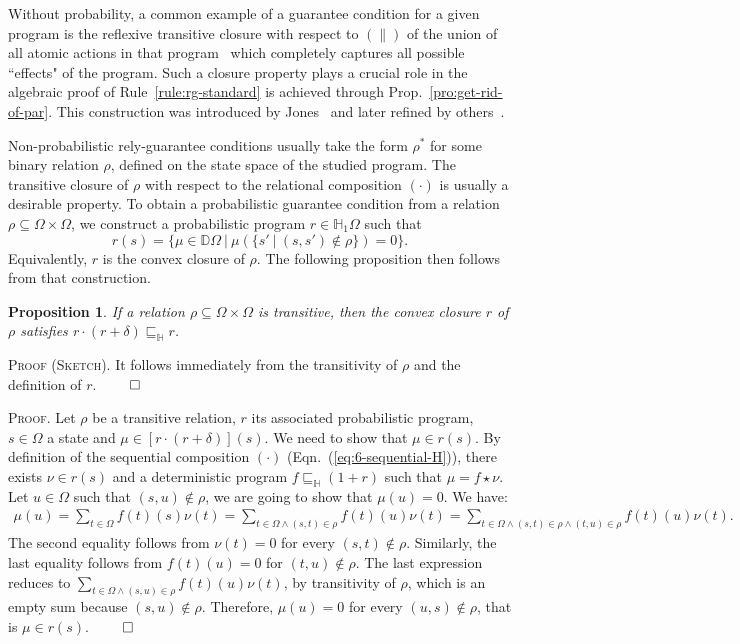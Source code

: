 \documentclass[review]{elsart}
\newtheorem{proposition}[definition]{Proposition}
\newenvironment{proof}{\par
\noindent
\textsc{Proof. }
\noindent}{\hfill\(\qed\)}
\newenvironment{proofsummary}{\par
\noindent
\textsc{Proof (Sketch). }
\noindent}{\hfill\(\qed\)}
\newcommand{\D}{\mathbb{D}}
\renewcommand{\H}{\mathbb{H}}
\newcommand{\unity}{\delta}
\newcommand{\convol}{\star}
\newcommand{\bks}{*}
\newcommand{\refbyh}{\sqsubseteq_{\mathbb{H}}}
\newcommand{\Eqn}[1]{Eqn.~(\ref{#1})}
\newcommand{\Prop}[1]{Prop.~\ref{#1}}
\begin{document}
Without probability, a common example of a guarantee condition for a given program is the reflexive transitive closure with respect to $(\|)$ of the union of all atomic actions in that program~\cite{Hoa09a} which completely captures all possible ``effects" of the program. Such a closure property plays a crucial role in the algebraic proof of Rule~\ref{rule:rg-standard} is achieved through \Prop{pro:get-rid-of-par}. This construction was introduced by Jones~\cite{Jon81} and later refined by others~\cite{Din02,Jon12,Hoa09a}.

Non-probabilistic rely-guarantee conditions usually take the form $\rho^{\bks}$ for some binary relation $\rho$, defined on the state space of the studied program. The transitive closure of $\rho$ with respect to the relational composition $(\cdot)$ is usually a desirable property. To obtain a probabilistic guarantee condition from a relation $\rho{\subseteq}\Omega{\times}\Omega$, we construct a probabilistic program $r{\in} \H_1\Omega$  such that 
\[
	r(s) = \{\mu{\in}\D \Omega\ |\ \mu(\{s'\ |\ (s,s'){\notin} \rho\}) = 0\}.
\]
Equivalently, $r$ is the convex closure of $\rho$. The following proposition then follows from that construction.
\begin{proposition}\label{pro:transitive-convex-closure}
If a relation $\rho{\subseteq}\Omega{\times}\Omega$ is transitive, then the convex closure $r$ of $\rho$ satisfies $r{\cdot}(r{+}\unity)\refbyh r$.
\end{proposition}

\begin{proofsummary}
It follows immediately from the transitivity of $\rho$ and the definition of $r$.
\end{proofsummary}

\begin{proof}
Let $\rho$ be a transitive relation, $r$ its associated probabilistic program, $s{\in}\Omega$ a state and  $\mu{\in} [r{\cdot}(r{+}\unity)](s)$. We need to show that $\mu{\in} r(s)$. By definition of the sequential composition $(\cdot)$ (\Eqn{eq:6-sequential-H}), there exists $\nu{\in} r(s)$ and a deterministic program $f\refbyh (1{+}r)$ such that $\mu = f{\convol}\nu$. Let $u{\in}\Omega$ such that $(s,u){\notin}\rho$, we are going to show that $\mu(u) = 0$. We have:
\begin{align*}
\mu(u) = \sum_{t{\in}\Omega} f(t)(s)\nu(t) = \sum_{t{\in}\Omega\wedge (s,t){\in}\rho} f(t)(u)\nu(t) = \sum_{t{\in}\Omega\wedge (s,t){\in}\rho\wedge (t,u){\in}\rho}f(t)(u)\nu(t).
\end{align*}
The second equality follows from $\nu(t) = 0$ for every $(s,t){\notin}\rho$. Similarly, the last equality follows from $f(t)(u) = 0$ for $(t,u){\notin}\rho$. The last expression reduces to $\sum_{t{\in}\Omega\wedge (s,u){\in}\rho}f(t)(u)\nu(t)$, by transitivity of $\rho$, which is an empty sum because $(s,u){\notin}\rho$. Therefore, $\mu(u) = 0$ for every $(u,s){\notin}\rho$, that is $\mu{\in} r(s)$.
\end{proof}
\end{document}
